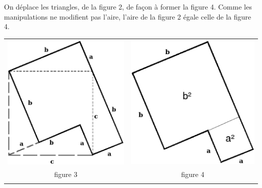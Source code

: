 \documentclass[letterpaper, 12pt]{article}
\begin{document}
On d\'eplace les triangles, de la figure 2, de fa\c con \`a former la figure 4. Comme les manipulations ne modifient pas l'aire, l'aire de la figure 2 \'egale celle de la figure 4.
\begin{center}
\begin{tabular}{c c}
\includegraphics[scale=0.35]{pythagore21.eps} & \includegraphics[scale=0.35]{a2b2.eps}\\
{\small figure 3} & {\small figure 4} \\
 & \\
\end{tabular}
\end{center}
\end{document}
